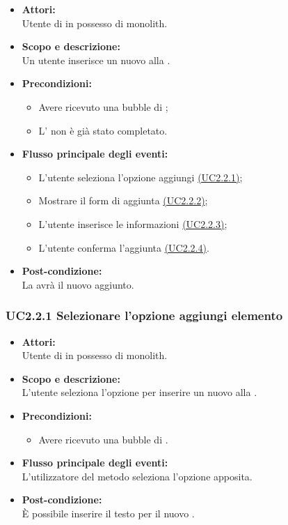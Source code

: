 \begin{itemize}
	\item \textbf{Attori:}
	\\Utente di  in possesso di monolith.
	\item \textbf{Scopo e descrizione:} 
	\\Un utente inserisce un nuovo  alla .
	\item \textbf{Precondizioni:}
	\begin{itemize}
		\item Avere ricevuto una bubble di ;
		\item L’ non è già stato completato.
	\end{itemize}
	\item \textbf{Flusso principale degli eventi:}
	\begin{itemize}
		\item L’utente seleziona l’opzione aggiungi  \hyperref[UC2.2.1]{(UC2.2.1)};
		\item Mostrare il form di aggiunta \hyperref[UC2.2.2]{(UC2.2.2)};
		\item L’utente inserisce le informazioni \hyperref[UC2.2.3]{(UC2.2.3)};
		\item L’utente conferma l’aggiunta \hyperref[UC2.2.4]{(UC2.2.4)}.
	\end{itemize}
	\item \textbf{Post-condizione:}
	\\La {} avrà il nuovo  aggiunto.
\end{itemize}

\subsubsection{UC2.2.1 Selezionare l’opzione aggiungi elemento} \label{UC2.2.1}

\begin{itemize}
	\item \textbf{Attori:}
	\\Utente di  in possesso di monolith.
	\item \textbf{Scopo e descrizione:} 
	\\L’utente seleziona l’opzione per inserire un nuovo  alla .
	\item \textbf{Precondizioni:}
	\begin{itemize}
		\item Avere ricevuto una bubble di .
	\end{itemize}
	\item \textbf{Flusso principale degli eventi:}
	\\L’utilizzatore del metodo seleziona l’opzione apposita.
	\item \textbf{Post-condizione:}
	\\È possibile inserire il testo per il nuovo . 
\end{itemize}

